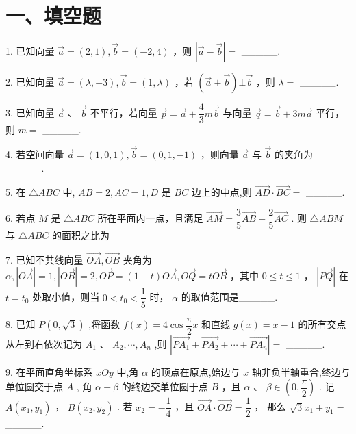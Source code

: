 \section*{一、填空题}

1. 已知向量 $\overrightarrow{a} = \left( {2,1}\right) ,\overrightarrow{b} = \left( {-2,4}\right)$ ，则 $\left| {\overrightarrow{a} - \overrightarrow{b}}\right|  =$ \_\_\_\_\_.

2. 已知向量 $\overrightarrow{a} = \left( {\lambda , - 3}\right) ,\overrightarrow{b} = \left( {1,\lambda }\right)$ ，若 $\left( {\overrightarrow{a} + \overrightarrow{b}}\right)  \bot  \overrightarrow{b}$ ，则 $\lambda  =$ \_\_\_\_\_.

3. 已知向量 $\overrightarrow{a}$ 、 $\overrightarrow{b}$ 不平行，若向量 $\overrightarrow{p} = \overrightarrow{a} + \dfrac{4}{3}m\overrightarrow{b}$ 与向量 $\overrightarrow{q} = \overrightarrow{b} + {3m}\overrightarrow{a}$ 平行，则 $m =$ \_\_\_\_\_.

4. 若空间向量 $\overrightarrow{a} = \left( {1,0,1}\right) ,\overrightarrow{b} = \left( {0,1, - 1}\right)$ ，则向量 $\overrightarrow{a}$ 与 $\overrightarrow{b}$ 的夹角为\_\_\_\_\_.

5. 在 $\bigtriangleup {ABC}$ 中, ${AB} = 2,{AC} = 1,D$ 是 ${BC}$ 边上的中点,则 $\overrightarrow{AD} \cdot  \overrightarrow{BC} =$ \_\_\_\_\_.

6. 若点 $M$ 是 $\bigtriangleup  {ABC}$ 所在平面内一点，且满足 $\overrightarrow{AM} = \dfrac{3}{5}\overrightarrow{AB} + \dfrac{2}{5}\overrightarrow{AC}$ . 则 $\bigtriangleup  {ABM}$ 与 $\bigtriangleup  {ABC}$ 的面积之比为

7. 已知不共线向量 $\overrightarrow{OA},\overrightarrow{OB}$ 夹角为 $\alpha ,\left| \overrightarrow{OA}\right|  = 1,\left| \overrightarrow{OB}\right|  = 2,\overrightarrow{OP} = \left( {1 - t}\right) \overrightarrow{OA},\overrightarrow{OQ} = t\overrightarrow{OB}$ ，其中 $0 \leq  t \leq  1$ ， $\left| \overrightarrow{PQ}\right|$ 在 $t = {t}_{0}$ 处取小值，则当 $0 < {t}_{0} < \dfrac{1}{5}$ 时， $\alpha$ 的取值范围是\_\_\_\_\_.

8. 已知 $P\left( {0,\sqrt{3}}\right)$ ,将函数 $f\left( x\right)  = 4\cos \dfrac{\pi }{2}x$ 和直线 $g\left( x\right)  = x - 1$ 的所有交点从左到右依次记为 ${A}_{1}$ 、 ${A}_{2},\cdots ,{A}_{n}$ ,则 $\left| {\overrightarrow{P{A}_{1}} + \overrightarrow{P{A}_{2}} + \cdots  + \overrightarrow{P{A}_{n}}}\right|  =$ \_\_\_\_\_.

9. 在平面直角坐标系 ${xOy}$ 中,角 $\alpha$ 的顶点在原点,始边与 $x$ 轴非负半轴重合,终边与单位圆交于点 $A$ , 角 $\alpha  + \beta$ 的终边交单位圆于点 $B$ ，且 $\alpha$ 、 $\beta  \in  \left( {0,\dfrac{\pi }{2}}\right)$ . 记 $A\left( {{x}_{1},{y}_{1}}\right)$ ， $B\left( {{x}_{2},{y}_{2}}\right)$ . 若 ${x}_{2} =  - \dfrac{1}{4}$ ，且 $\overrightarrow{OA} \cdot  \overrightarrow{OB} = \dfrac{1}{2}$ ， 那么 $\sqrt{3}{x}_{1} + {y}_{1} =$ \_\_\_\_\_.

